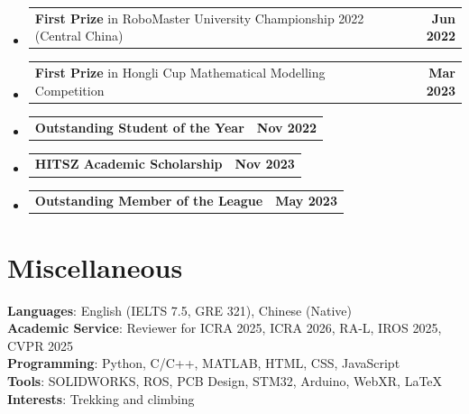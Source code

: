 \documentclass[letterpaper,11pt]{article}
\makeatletter
\newcommand{\resumeProjectHeading}[2]{
    \item
    \begin{tabular*}{1.001\textwidth}{l@{\extracolsep{\fill}}r}
      \small#1 & \textbf{\small #2}\\
    \end{tabular*}\vspace{-9pt}
}
\makeatother
\begin{document}
\begin{itemize}[leftmargin=0.0in, label={}, itemsep=-20pt]
    \resumeProjectHeading
      {\textbf{First Prize} in RoboMaster University Championship 2022 (Central China)}{Jun 2022}

    \resumeProjectHeading
      {\textbf{First Prize} in Hongli Cup Mathematical Modelling Competition}{Mar 2023}

    \resumeProjectHeading
      {\textbf{Outstanding Student of the Year}}{Nov 2022}

    \resumeProjectHeading
      {\textbf{HITSZ Academic Scholarship}}{Nov 2023}

    \resumeProjectHeading
      {\textbf{Outstanding Member of the League}}{May 2023}

\fi

  \end{itemize}

\section{Miscellaneous}
 \begin{itemize}[leftmargin=0.15in, label={}]
    \small{\item{
     \textbf{Languages}{: English (IELTS 7.5, GRE 321), Chinese (Native)} \\
     \textbf{Academic Service}{: Reviewer for ICRA 2025, ICRA 2026, RA-L, IROS 2025, CVPR 2025} \\
     \textbf{Programming}{: Python, C/C++, MATLAB, HTML, CSS, JavaScript} \\
     \textbf{Tools}{: SOLIDWORKS, ROS, PCB Design, STM32, Arduino, WebXR, \LaTeX} \\
     \textbf{Interests}{: Trekking and climbing}
    }}
 \end{itemize}
\end{document}
